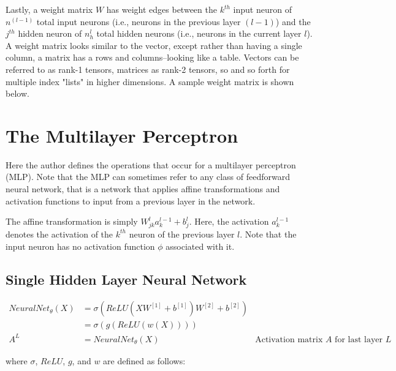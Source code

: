 \documentclass{article}
\begin{document}
Lastly, a weight matrix $W$ has weight edges between the $k^{th}$
input neuron of $n^{(l-1)}$ total input neurons (i.e., neurons in the previous layer
$(l-1)$) and the $j^{th}$ hidden neuron of $n_h^{l}$ total hidden neurons (i.e.,
neurons in the current layer $l$). A weight matrix looks similar to the vector, except rather than having a single
column, a matrix has a rows and columns--looking like a table. Vectors can
be referred to as rank-1 tensors, matrices as rank-2 tensors, so and so forth
for multiple index "lists" in higher dimensions. A sample weight matrix is
shown below.



\section{The Multilayer Perceptron}
\quad Here the author defines the operations that occur for a multilayer perceptron (MLP).
Note that the MLP can sometimes refer to any class of feedforward
neural network, that is a network that applies affine transformations and
activation functions to input from a previous layer in the network.

The affine transformation is simply $W_{jk}^{l} a_{k}^{l-1} + b_{j}^{l}$. Here,
the activation $a_k^{l-1}$ denotes the activation of the $k^{th}$ neuron of the
previous layer $l$. Note that the input neuron has no activation function $\phi$
associated with it.

\subsection{Single Hidden Layer Neural Network}
\begin{equation}
	\begin{aligned}
		NeuralNet_{\theta}(X) & =
		\sigma(ReLU(XW^{[1]}
		+ {b}^{[1]})W^{[2]} + {b}^{[2]})                                                                  \\
		                      & = \sigma(g(ReLU(w(X))))                                                   \\
		A^{L}                 & = NeuralNet_{\theta}(X) & \text{Activation matrix $A$ for last layer $L$}
	\end{aligned}
\end{equation}

where $\sigma$, $ReLU$, $g$, and $w$ are defined as follows:
\end{document}
